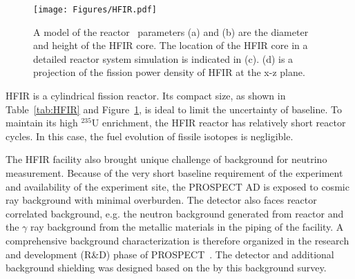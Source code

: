 \begin{figure}
    \centering
    \texttt{[image: Figures/HFIR.pdf]}
    \caption[The dimensions and power distribution of HFIR]{A model of the reactor~\cite{bib:prospect_nim} parameters (a) and (b) are the diameter and height of the HFIR core.
    The location of the HFIR core in a detailed reactor system simulation is indicated in (c).
    (d) is a projection of the fission power density of HFIR at the x-z plane.}
    \label{fig:HFIR}
\end{figure}

    HFIR is a cylindrical fission reactor.
    Its compact size, as shown in Table~\ref{tab:HFIR} and Figure~\ref{fig:HFIR}, is ideal to limit the uncertainty of baseline.
    To maintain its high $^{235}$U enrichment, the HFIR reactor has relatively short reactor cycles.
    In this case, the fuel evolution of fissile isotopes is negligible.
    
    The HFIR facility also brought unique challenge of background for neutrino measurement. 
    Because of the very short baseline requirement of the experiment and availability of the experiment site, the PROSPECT AD is exposed to cosmic ray background with minimal overburden. 
    The detector also faces reactor correlated background, e.g. the neutron background generated from reactor and the $\gamma$ ray background from the metallic materials in the piping of the facility.
    A comprehensive background characterization is therefore organized in the research and development (R\&D) phase of PROSPECT~\cite{bib:prospect_background}. 
    The detector and additional background shielding was designed based on the by this background survey.
    

